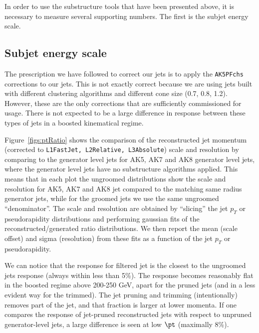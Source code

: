 
In order to use the substructure tools that have been presented above, 
it is necessary to measure several supporting numbers.
The first is the subjet energy scale. 

\ifnpas
\subsection{Subjet energy scale}
\fi 
\label{sec:substructure_jec}




\ifnpas

The prescription we have followed to correct our jets is to apply the
\verb!AK5PFchs! corrections to our jets. This is not exactly correct
because we are using jets built with different clustering algorithms and different cone size (0.7, 0.8, 1.2).
However, these are the only corrections that are sufficiently commissioned
for usage. There is not expected to be a large difference in response between
these types of jets in a boosted kinematical regime.

Figure~\ref{figs:ptRatio} 
shows the comparison of the reconstructed jet momentum (corrected to {\tt L1FastJet, L2Relative, L3Absolute}) scale and 
resolution by comparing to the generator level jets for AK5, AK7 and AK8 generator level jets, where the  generator
level jets have no substructure
algorithms applied. This means that in each plot the ungroomed distributions show the scale and resolution for AK5, AK7 and AK8 jet compared to the matching same radius generator jets, while for the groomed jets we use the same ungroomed ``denominator''.  
The scale and resolution are obtained by ``slicing'' the jet $p_T$ or pseudorapidity distributions and performing gaussian fits of the reconstructed/generated ratio distributions. We then report the mean (scale offset) and sigma (resolution) from these fits as a function of the jet $p_T$ or pseudorapidity.
  
We can notice that the response for filtered jet is the closest to the ungroomed jets response (always within less than 5\%). 
The response becomes reasonably flat in the boosted regime above 200-250 GeV, apart for the pruned jets (and in a less evident way for the trimmed). 
The jet pruning and trimming (intentionally) removes part
of the jet, and that fraction is larger at lower momenta. If one compares the
response of jet-pruned reconstructed jets with respect to unpruned
generator-level jets, a large difference is seen at low $\pt$ (maximally 8\%).
 
